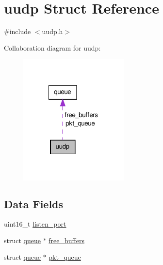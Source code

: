 \hypertarget{structuudp}{\section{uudp Struct Reference}
\label{structuudp}
}


{\ttfamily \#include $<$uudp.\-h$>$}



Collaboration diagram for uudp\-:\nopagebreak
\begin{figure}[H]
\begin{center}
\leavevmode
\includegraphics[width=156pt]{structuudp__coll__graph}
\end{center}
\end{figure}
\subsection*{Data Fields}
\begin{DoxyCompactItemize}
\item 
uint16\-\_\-t \hyperlink{structuudp_a00e34c9d365186d751ac02d8fd8fb130}{listen\-\_\-port}
\item 
struct \hyperlink{structqueue}{queue} $\ast$ \hyperlink{structuudp_a82b920ae77d6f50adebe104fde7bd372}{free\-\_\-buffers}
\item 
struct \hyperlink{structqueue}{queue} $\ast$ \hyperlink{structuudp_a173d6e92d93ed6c5a8e6bae66a66c132}{pkt\-\_\-queue}
\end{DoxyCompactItemize}


